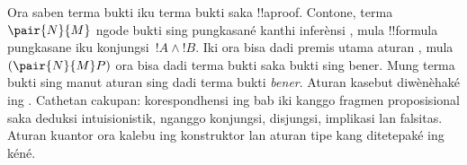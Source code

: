 \documentclass[../../../include/open-logic-section]{subfiles}
\begin{document}
Ora saben terma bukti iku terma bukti saka !!a{proof}. Contone,
terma $\pair{N}{M}$ ngode bukti sing pungkasané kanthi inferènsi
\Intro{\land}, mula !!{formula} pungkasane iku konjungsi~$!A \land !B$.
Iki ora bisa dadi premis utama aturan \Elim{\lif}, mula
$(\pair{N}{M}P)$ ora bisa dadi terma bukti saka bukti sing bener.
Mung terma bukti sing manut aturan  sing dadi terma bukti
\emph{bener}. Aturan kasebut diwènèhaké ing .
Cathetan cakupan: korespondhensi ing bab iki kanggo fragmen proposisional saka deduksi intuisionistik, nganggo konjungsi, disjungsi, implikasi lan falsitas. Aturan kuantor ora kalebu ing konstruktor lan aturan tipe kang ditetepaké ing kéné.


\end{document}
